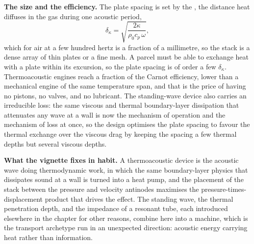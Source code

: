 \textbf{The size and the efficiency.} The plate spacing is set by the
, the distance heat diffuses in the gas
during one acoustic period,
\[
\delta_\kappa = \sqrt{\frac{2\kappa}{\rho_0 c_p\,\omega}},
\]
which for air at a few hundred hertz is a fraction of a millimetre, so the
stack is a dense array of thin plates or a fine mesh. A parcel must be able
to exchange heat with a plate within its excursion, so the plate spacing is
of order a few $\delta_\kappa$. Thermoacoustic engines reach a fraction of
the Carnot efficiency, lower than a mechanical engine of the same
temperature span, and that is the price of having no pistons, no valves, and
no lubricant. The standing-wave device also carries an irreducible loss: the
same viscous and thermal boundary-layer dissipation that attenuates any wave
at a wall is now the mechanism of operation and the mechanism of loss at
once, so the design optimises the plate spacing to favour the thermal
exchange over the viscous drag by keeping the spacing a few thermal depths
but several viscous depths.

\textbf{What the vignette fixes in habit.} A thermoacoustic device is the
acoustic wave doing thermodynamic work, in which the same boundary-layer
physics that dissipates sound at a wall is turned into a heat pump, and the
placement of the stack between the pressure and velocity antinodes maximises
the pressure-times-displacement product that drives the effect. The standing
wave, the thermal penetration depth, and the impedance of a resonant tube,
each introduced elsewhere in the chapter for other reasons, combine here into
a machine, which is the transport archetype run in an unexpected direction:
acoustic energy carrying heat rather than information.

